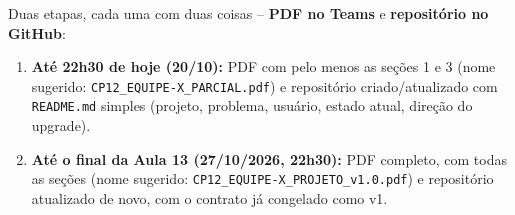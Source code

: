 \documentclass[11pt,a4paper]{article}
\newcommand{\cod}[1]{\texttt{#1}}
\begin{document}
Duas etapas, cada uma com duas coisas -- \textbf{PDF no Teams} e \textbf{repositório no GitHub}:

\begin{enumerate}
\item \textbf{Até 22h30 de hoje (20/10):} PDF com pelo menos as seções 1 e 3 (nome sugerido:
  \cod{CP12\_EQUIPE-X\_PARCIAL.pdf}) e repositório criado/atualizado com \cod{README.md} simples
  (projeto, problema, usuário, estado atual, direção do upgrade).
\item \textbf{Até o final da Aula 13 (27/10/2026, 22h30):} PDF completo, com todas as seções
  (nome sugerido: \cod{CP12\_EQUIPE-X\_PROJETO\_v1.0.pdf}) e repositório atualizado de novo,
  com o contrato já congelado como v1.
\end{enumerate}
\end{document}

